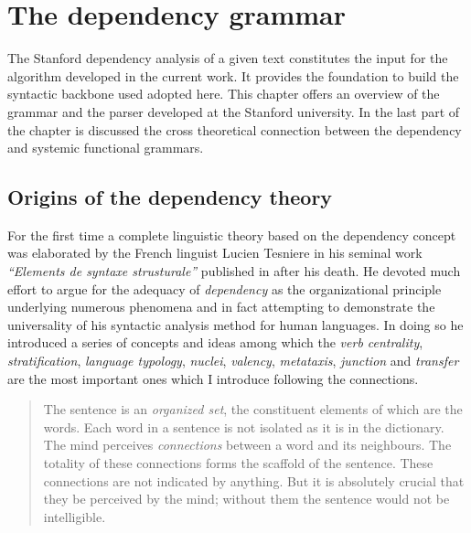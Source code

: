 \chapter{The dependency grammar}
\label{ch:dependecy-grammar}

The Stanford dependency analysis of a given text constitutes the input for the algorithm developed in the current work. It provides the foundation to build the syntactic backbone used adopted here. This chapter offers an overview of the grammar and the parser developed at the Stanford university. In the last part of the chapter is discussed the cross theoretical connection between the dependency and systemic functional grammars. 

\section{Origins of the dependency theory}
\label{sec:origins}
For the first time a complete linguistic theory based on the dependency concept was elaborated by the French linguist Lucien Tesniere in his seminal work \textit{``Elements de syntaxe strusturale''} published in \citeyear{Tesniere59} after his death. He devoted much effort to argue for the adequacy of \textit{dependency} as the organizational principle underlying numerous phenomena and in fact attempting to demonstrate the universality of his syntactic analysis method for human languages. In doing so he introduced a series of concepts and ideas among which the \textit{verb centrality}, \textit{stratification}, \textit{language typology}, \textit{nuclei}, \textit{valency}, \textit{metataxis}, \textit{junction} and \textit{transfer} are the most important ones which I introduce following the connections.


\begin{quotation}
    The sentence is an \textit{organized set}, the constituent elements of which are the words. Each word in a sentence is not isolated as it is in the dictionary. The mind perceives \textit{connections} between a word and its neighbours. The totality of these connections forms the scaffold of the sentence. These connections are not indicated by anything. But it is absolutely crucial that they be perceived by the mind; without them the sentence would not be intelligible. \citep[3]{Tesniere2015}
\end{quotation}

